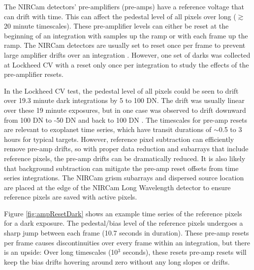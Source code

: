 \documentclass{aastex62}
\begin{document}
The NIRCam detectors' pre-amplifiers (pre-amps) have a reference voltage that can drift with time.
This can affect the pedestal level of all pixels over long ($\gtrsim$ 20 minute timescales).
These pre-amplifier levels can either be reset at the beginning of an integration with samples up the ramp or with each frame up the ramp.
The NIRCam detectors are usually set to reset once per frame to prevent large amplifier drifts over an integration \citep{robberto2014refPixPreAmp}.
However, one set of darks was collected at Lockheed CV with a reset only once per integration to study the effects of the pre-amplifier resets.

In the Lockheed CV test, the pedestal level of all pixels could be seen to drift over 19.3 minute dark integrations by 5 to 100 DN.
The drift was usually linear over these 19 minute exposures, but in one case was observed to drift downward from 100 DN to -50 DN and back to 100 DN \citep{robberto2014refPixPreAmp}.
The timescales for pre-amp resets are relevant to exoplanet time series, which have transit durations of $\sim$0.5 to 3 hours for typical targets.
However, reference pixel subtraction can efficiently remove pre-amp drifts, so with proper data reduction and subarrays that include reference pixels, the pre-amp drifts can be dramatically reduced.
It is also likely that background subtraction can mitigate the pre-amp reset offsets from time series integrations.
The NIRCam grism subarrays and dispersed source location are placed at the edge of the NIRCam Long Wavelength detector to ensure reference pixels are saved with active pixels.

Figure \ref{fig:ampResetDark} shows an example time series of the reference pixels for a dark exposure.
The pedestal/bias level of the reference pixels undergoes a sharp jump between each frame (10.7 seconds in duration).
These pre-amp resets per frame causes discontinuities over every frame within an integration, but there is an upside:
Over long timescales (10$^3$ seconds), these resets pre-amp resets will keep the bias drifts hovering around zero without any long slopes or drifts.
\end{document}

